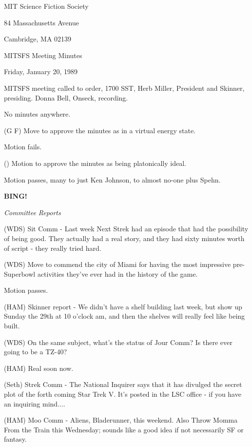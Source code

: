 \documentclass[12pt]{article}
\newcommand{\bing}{{\bf BING!} }
\newcommand{\goto}[1]{\bing \vskip 12pt \centerline{{\em{#1}}}}
\begin{document}
\begin{center}

MIT Science Fiction Society 

84 Massachusetts Avenue

Cambridge, MA 02139

\vspace{12pt}

MITSFS Meeting Minutes 

Friday, January 20, 1989

\end{center}
 
\vspace{18pt}

\setlength{\parskip}{6pt}

\noindent
MITSFS meeting called to order, 1700 SST, Herb Miller, President and Skinner, presiding. Donna Bell, Onseck, recording.

No minutes anywhere.

(G F) Move to approve the minutes as in a virtual energy state.

Motion fails.

() Motion to approve the minutes as being platonically ideal.

Motion passes, many to just Ken Johnson, to almost no-one plus Spehn.

\goto{Committee Reports}

(WDS) Sit Comm - Last week Next Strek had an episode that had the possibility of being good. They actually had a real story, and they had sixty minutes worth of script - they really tried hard.

(WDS) Move to commend the city of Miami for having the most impressive pre-Superbowl activities they've ever had in the history of the game.

Motion passes.

(HAM) Skinner report - We didn't have a shelf building last week, but show up Sunday the 29th at 10 o'clock am, and then the shelves will really feel like being built.

(WDS) On the same subject, what's the status of Jour Comm?  Is there ever going to be a TZ-40?

(HAM) Real soon now.

(Seth) Strek Comm - The National Inquirer says that it has divulged the secret plot of the forth coming Star Trek V.  It's posted in the LSC office - if you have an inquiring mind....

(HAM) Moo Comm - Aliens, Bladerunner, this weekend.  Also Throw Momma From the Train this Wednesday; sounds like a good idea if not necessarily SF or fantasy. 
\end{document}
